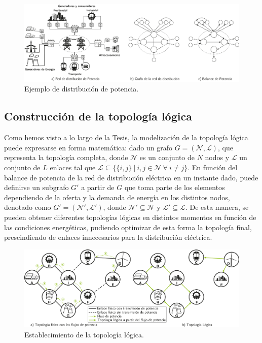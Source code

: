 \begin{figure}[ht!]
    \centering
    \includegraphics[width=\textwidth]{fig/07_bloste/bloste_01.pdf}
    \caption{Ejemplo de distribución de potencia.}
    \label{fig:bloste_01}
\end{figure}

\subsection{Construcción de la topología lógica}
\label{subsec:logical-topo}

Como hemos visto a lo largo de la Tesis, la modelización de la topología lógica puede expresarse en forma matemática: dado un grafo \( G = (\mathcal{N}, \mathcal{L}) \), que representa la topología completa, donde \( \mathcal{N} \) es un conjunto de \( N \) nodos y \( \mathcal{L} \) un conjunto de \( L \) enlaces tal que \( \mathcal{L} \subseteq \{\{i,j\} \: | \: i,j \in \mathcal{N} \: \forall \: i \neq j\} \). En función del balance de potencia de la red de distribución eléctrica en un instante dado, puede definirse un subgrafo \(G'\) a partir de \(G\) que toma parte de los elementos dependiendo de la oferta y la demanda de energía en los distintos nodos, denotado como \( G' = (\mathcal{N}', \mathcal{L}') \), donde \( \mathcal{N}' \subseteq \mathcal{N} \) y \( \mathcal{L}' \subseteq \mathcal{L} \). De esta manera, se pueden obtener diferentes topologías lógicas en distintos momentos en función de las condiciones energéticas, pudiendo optimizar de esta forma la topología final, prescindiendo de enlaces innecesarios para la distribución eléctrica.


\begin{figure}[ht!]
    \centering
    \includegraphics[width=\textwidth]{fig/07_bloste/bloste_02.pdf}
    \caption{Establecimiento de la topología lógica.}
    \label{fig:bloste_02}
\end{figure}

